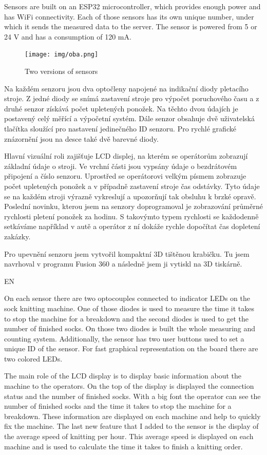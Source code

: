 \documentclass[12pt, a4paper]{article}
\begin{document}
Sensors are built on an ESP32 microcontroller, which provides enough power and has WiFi connectivity.
Each of those sensors has its own unique number, under which it sends the measured data to the server.
The sensor is powered from 5 or 24 V and has a consumption of 120 mA.

\begin{figure}[t]
    \centering
    \texttt{[image: img/oba.png]}
    \caption{Two versions of sensors}
    \label{fig:dveVerze}
\end{figure}

Na každém senzoru jsou dva optočleny napojené na indikační diody pletacího stroje.
Z jedné diody se snímá zastavení stroje pro výpočet poruchového času a z druhé senzor získává počet upletených ponožek.
Na těchto dvou údajích je postavený celý měřící a výpočetní systém.
Dále senzor obsahuje dvě uživatelská tlačítka sloužící pro nastavení jedinečného ID senzoru.
Pro rychlé grafické znázornění jsou na desce také dvě barevné diody.

Hlavní vizuální roli zajišťuje LCD displej, na kterém se operátorům zobrazují základní údaje o stroji.
Ve vrchní části jsou vypsány údaje o bezdrátovém připojení a číslo senzoru.
Uprostřed se operátorovi velkým písmem zobrazuje počet upletených ponožek a v případně zastavení stroje čas odstávky.
Tyto údaje se na každém stroji výrazně vykreslují a upozorňují tak obsluhu k brzké opravě.
Poslední novinku, kterou jsem na senzory doprogramoval je zobrazování průměrné rychlosti pletení ponožek za hodinu.
S takovýmto typem rychlosti se každodenně setkáváme například v autě a operátor z ní dokáže rychle dopočítat čas dopletení zakázky.

Pro upevnění senzoru jsem vytvořil kompaktní 3D tištěnou krabičku.
Tu jsem navrhoval v programu Fusion 360 a následně jsem ji vytiskl na 3D tiskárně.

EN

On each sensor there are two optocouples connected to indicator LEDs on the sock knitting machine.
One of those diodes is used to measure the time it takes to stop the machine for a breakdown and the second diodes is used to get the number of finished socks.
On those two diodes is built the whole measuring and counting system.
Additionally, the sensor has two user buttons used to set a unique ID of the sensor.
For fast graphical representation on the board there are two colored LEDs.

The main role of the LCD display is to display basic information about the machine to the operators.
On the top of the display is displayed the connection status and the number of finished socks.
With a big font the operator can see the number of finished socks and the time it takes to stop the machine for a breakdown.
These information are displayed on each machine and help to quickly fix the machine.
The last new feature that I added to the sensor is the display of the average speed of knitting per hour.
This average speed is displayed on each machine and is used to calculate the time it takes to finish a knitting order.
\end{document}
